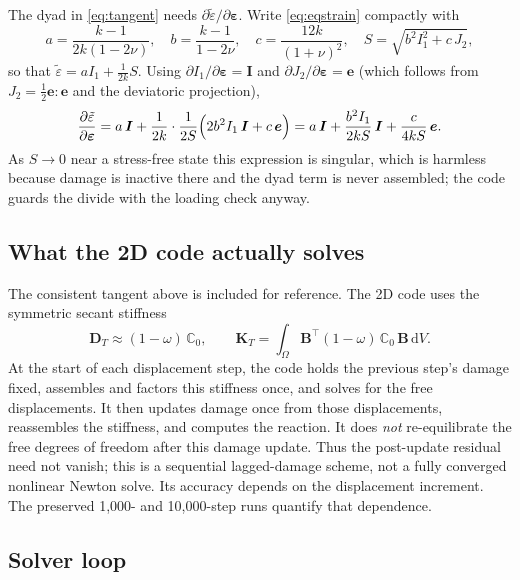 \documentclass[11pt]{article}
\newcommand{\eps}{\bm{\varepsilon}}
\newcommand{\C}{\mathbb{C}}
\newcommand{\Id}{\bm{I}}
\newcommand{\eqs}{\tilde{\varepsilon}}
\newcommand{\dd}{\,\mathrm{d}}
\begin{document}
The dyad in \eqref{eq:tangent} needs $\partial\eqs/\partial\eps$. Write \eqref{eq:eqstrain}
compactly with
%
\begin{equation}
a = \frac{k-1}{2k(1-2\nu)}, \quad
b = \frac{k-1}{1-2\nu}, \quad
c = \frac{12k}{(1+\nu)^2}, \quad
S = \sqrt{b^2 I_1^2 + c\,J_2},
\end{equation}
%
so that $\eqs = a I_1 + \tfrac{1}{2k}S$. Using $\partial I_1/\partial\eps = \Id$ and
$\partial J_2/\partial\eps = \bm e$ (which follows from $J_2=\tfrac12\bm e:\bm e$ and the
deviatoric projection),
%
\begin{equation}
\frac{\partial\eqs}{\partial\eps}
= a\,\Id
+ \frac{1}{2k}\cdot\frac{1}{2S}\Bigl(2b^2 I_1\,\Id + c\,\bm e\Bigr)
= a\,\Id + \frac{b^2 I_1}{2kS}\,\Id + \frac{c}{4kS}\,\bm e .
\label{eq:deqs}
\end{equation}
%
As $S\to 0$ near a stress-free state this expression is singular, which is harmless because
damage is inactive there and the dyad term is never assembled; the code guards the divide
with the loading check anyway.

\subsection{What the 2D code actually solves}

The consistent tangent above is included for reference. The 2D code
uses the symmetric secant stiffness
%
\begin{equation}
\bm D_T \approx (1-\omega)\,\C_0,
\qquad
\bm K_T = \int_\Omega \bm B^{\!\top}(1-\omega)\,\C_0\,\bm B \dd V .
\label{eq:secant}
\end{equation}
%
At the start of each displacement step, the code holds the previous step's
damage fixed, assembles and factors this stiffness once, and solves for the
free displacements. It then updates damage once from those displacements,
reassembles the stiffness, and computes the reaction. It does \emph{not}
re-equilibrate the free degrees of freedom after this damage update. Thus the
post-update residual need not vanish; this is a sequential lagged-damage
scheme, not a fully converged nonlinear Newton solve. Its accuracy depends
on the displacement increment. The preserved 1,000- and 10,000-step runs
quantify that dependence.

\subsection{Solver loop}
\end{document}

